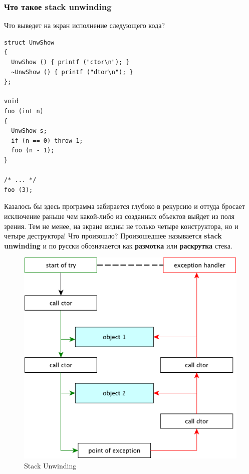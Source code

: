 \documentclass[a4paper,12pt,oneside]{article}
\begin{document}
\subsubsection{Что такое stack unwinding}\label{StackUnwinding}

Что выведет на экран исполнение следующего кода?

\begin{lstlisting}
struct UnwShow
{
  UnwShow () { printf ("ctor\n"); }
  ~UnwShow () { printf ("dtor\n"); }
};

void
foo (int n)
{
  UnwShow s;
  if (n == 0) throw 1;
  foo (n - 1);
}

/* ... */
foo (3);

\end{lstlisting}

Казалось бы здесь программа забирается глубоко в рекурсию и оттуда бросает исключение раньше чем какой-либо из созданных объектов выйдет из поля зрения. Тем не менее, на экране видны не только четыре конструктора, но и четыре деструктора! Что произошло? Произошедшее называется \textbf{stack unwinding} и по русски обозначается как \textbf{размотка} или \textbf{раскрутка} стека.

\begin{figure}[h!]
\centering
\includegraphics[width=1.0\textwidth]{illustrations/stack-unwind-crop.pdf}
\caption{Stack Unwinding}
\label{fig:stack_unwind}
\end{figure}
\end{document}
